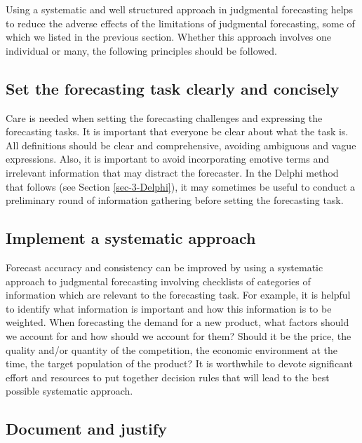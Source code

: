 \documentclass[]{book}
\begin{document}
Using a systematic and well structured approach in judgmental forecasting helps to reduce the adverse effects of the limitations of judgmental forecasting, some of which we listed in the previous section. Whether this approach involves one individual or many, the following principles should be followed.

\hypertarget{set-the-forecasting-task-clearly-and-concisely}{%
\subsection*{Set the forecasting task clearly and concisely}\label{set-the-forecasting-task-clearly-and-concisely}}

Care is needed when setting the forecasting challenges and expressing the forecasting tasks. It is important that everyone be clear about what the task is. All definitions should be clear and comprehensive, avoiding ambiguous and vague expressions. Also, it is important to avoid incorporating emotive terms and irrelevant information that may distract the forecaster. In the Delphi method that follows (see Section \ref{sec-3-Delphi}), it may sometimes be useful to conduct a preliminary round of information gathering before setting the forecasting task.

\hypertarget{implement-a-systematic-approach}{%
\subsection*{Implement a systematic approach}\label{implement-a-systematic-approach}}

Forecast accuracy and consistency can be improved by using a systematic approach to judgmental forecasting involving checklists of categories of information which are relevant to the forecasting task. For example, it is helpful to identify what information is important and how this information is to be weighted. When forecasting the demand for a new product, what factors should we account for and how should we account for them? Should it be the price, the quality and/or quantity of the competition, the economic environment at the time, the target population of the product? It is worthwhile to devote significant effort and resources to put together decision rules that will lead to the best possible systematic approach.

\hypertarget{document-and-justify}{%
\subsection*{Document and justify}\label{document-and-justify}}
\end{document}
